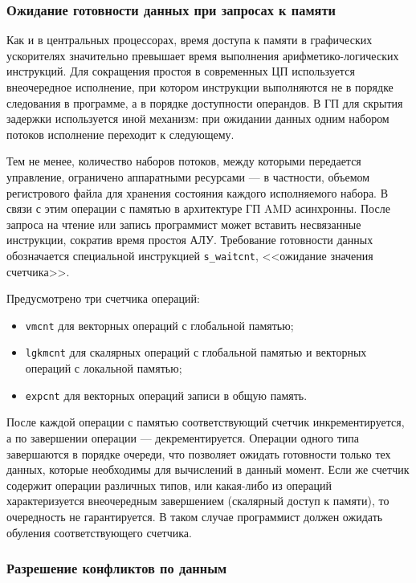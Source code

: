 \documentclass[a4paper,14pt]{extarticle}
\newenvironment{ul}{\begin{itemize}[noitemsep,topsep=0em]}{\end{itemize}\vspace{20pt}}
\begin{document}
\subsubsection{Ожидание готовности данных при запросах к памяти}
\label{section:gcn-waitcnt}

Как и в центральных процессорах, время доступа к памяти в графических ускорителях
значительно превышает время выполнения арифметико-логических инструкций.
Для сокращения простоя в современных ЦП используется внеочередное исполнение, при котором
инструкции выполняются не в порядке следования в программе, а в порядке доступности операндов.
В ГП для скрытия задержки используется иной механизм: при ожидании данных одним набором
потоков исполнение переходит к следующему.

Тем не менее, количество наборов потоков, между которыми передается управление, ограничено
аппаратными ресурсами — в частности, объемом регистрового файла для хранения состояния каждого
исполняемого набора. В связи с этим операции с памятью в архитектуре ГП AMD асинхронны.
После запроса на чтение или запись программист может вставить несвязанные инструкции,
сократив время простоя АЛУ. Требование готовности данных обозначается специальной
инструкцией \texttt{s\_waitcnt}, <<ожидание значения счетчика>>.

Предусмотрено три счетчика операций:
\begin{ul}
\item \texttt{vmcnt} для векторных операций с глобальной памятью;
\item \texttt{lgkmcnt} для скалярных операций с глобальной памятью и векторных операций с локальной памятью;
\item \texttt{expcnt} для векторных операций записи в общую память.
\end{ul}

После каждой операции с памятью соответствующий счетчик инкрементируется, а по завершении
операции — декрементируется. Операции одного типа завершаются в порядке очереди, что
позволяет ожидать готовности только тех данных, которые необходимы для вычислений в данный
момент. Если же счетчик содержит операции различных типов, или какая-либо из операций
характеризуется внеочередным завершением (скалярный доступ к памяти), то очередность не гарантируется.
В таком случае программист должен ожидать обуления соответствующего счетчика.

\subsubsection{Разрешение конфликтов по данным}
\end{document}
